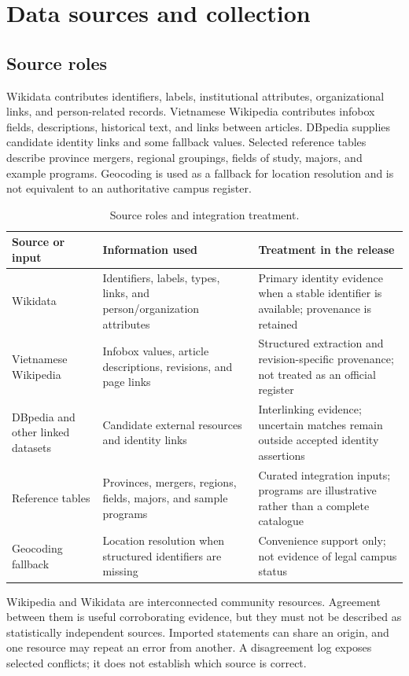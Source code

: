 \documentclass[11pt,a4paper]{article}
\begin{document}
\section{Data sources and collection}
\subsection{Source roles}
Wikidata contributes identifiers, labels, institutional attributes, organizational links,
and person-related records. Vietnamese Wikipedia contributes infobox fields, descriptions,
historical text, and links between articles. DBpedia supplies candidate identity links and
some fallback values. Selected reference tables describe province mergers, regional
groupings, fields of study, majors, and example programs. Geocoding is used as a fallback
for location resolution and is not equivalent to an authoritative campus register.

\begin{table}[htbp]\centering\small
\caption{Source roles and integration treatment.}\label{tab:sources}
\begin{tabularx}{\textwidth}{p{3.0cm}p{4.0cm}X}\toprule
Source or input & Information used & Treatment in the release \\\midrule
Wikidata & Identifiers, labels, types, links, and person/organization attributes & Primary identity evidence when a stable identifier is available; provenance is retained \\
Vietnamese Wikipedia & Infobox values, article descriptions, revisions, and page links & Structured extraction and revision-specific provenance; not treated as an official register \\
DBpedia and other linked datasets & Candidate external resources and identity links & Interlinking evidence; uncertain matches remain outside accepted identity assertions \\
Reference tables & Provinces, mergers, regions, fields, majors, and sample programs & Curated integration inputs; programs are illustrative rather than a complete catalogue \\
Geocoding fallback & Location resolution when structured identifiers are missing & Convenience support only; not evidence of legal campus status \\
\bottomrule
\end{tabularx}
\end{table}

Wikipedia and Wikidata are interconnected community resources. Agreement between them is
useful corroborating evidence, but they must not be described as statistically independent
sources. Imported statements can share an origin, and one resource may repeat an error
from another. A disagreement log exposes selected conflicts; it does not establish which
source is correct.
\end{document}
